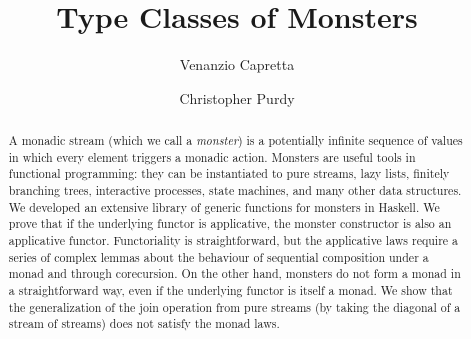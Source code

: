 \documentclass[runningheads]{llncs}
\begin{document}
\title{Type Classes of Monsters}

\author{Venanzio Capretta \and
        Christopher Purdy}




\maketitle


\newtheorem{lemmainner}{Lemma}
\newenvironment{lemmaa}[1]{%
  \renewcommand\thelemmainner{#1}%
  \lemmainner
}{\endlemmainner}

\begin{abstract}
A monadic stream (which we call a {\em monster}) is a potentially infinite sequence of values in which every element triggers a monadic action.
Monsters are useful tools in functional programming: they can be instantiated to pure streams, lazy lists, finitely branching trees, interactive processes, state machines, and many other data structures.
We developed an extensive library of generic functions for monsters in Haskell.
We prove that if the underlying functor is applicative, the monster constructor is also an applicative functor.
Functoriality is straightforward, but the applicative laws require a series of complex lemmas about the behaviour of sequential composition under a monad and through corecursion.
On the other hand, monsters do not form a monad in a straightforward way, even if the underlying functor is itself a monad.
We show that the generalization of the join operation from pure streams (by taking the diagonal of a stream of streams) does not satisfy the monad laws.
\end{abstract}









\appendix

\end{document}

